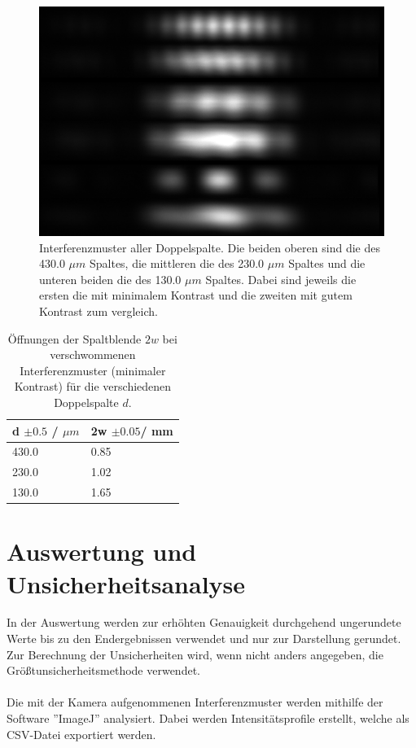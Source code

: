 \documentclass[12pt,a4paper,twoside]{article}
\begin{document}
\begin{figure}[H]
    \centering
    \includegraphics[width=0.6\linewidth]{nudes/aufgabe 4.jpg}
    \caption{Interferenzmuster aller Doppelspalte. Die beiden oberen sind die des 430.0 $\mu m$ Spaltes, die mittleren die des 230.0 $\mu m$ Spaltes und die unteren beiden die des 130.0 $\mu m$ Spaltes. 
    Dabei sind jeweils die ersten die mit minimalem Kontrast und die zweiten mit gutem Kontrast zum vergleich. }
    \label{fig:aufgabe 4}
\end{figure}

\begin{table}[H]
    \centering
    \caption{Öffnungen der  Spaltblende $2w$ bei verschwommenen Interferenzmuster (minimaler Kontrast) für die verschiedenen Doppelspalte $d$. }
    \label{tab:öffnungen}
    \begin{tabular}{| l | l |}
        \hline
        d $\pm 0.5$ / $\mu m $ & 2w $\pm 0.05$/ mm \\
        \hline
        430.0 & 0.85  \\
        230.0 & 1.02  \\
        130.0 & 1.65  \\
        \hline
    \end{tabular}
\end{table}

\section{Auswertung und Unsicherheitsanalyse} %

In der Auswertung werden zur erhöhten Genauigkeit durchgehend ungerundete Werte bis zu den Endergebnissen verwendet und nur zur Darstellung gerundet. \\
Zur Berechnung der Unsicherheiten wird, wenn nicht anders angegeben, die Größtunsicherheitsmethode verwendet.
\\
\\
Die mit der Kamera aufgenommenen Interferenzmuster werden mithilfe der Software ''ImageJ'' analysiert. 
Dabei werden Intensitätsprofile erstellt, welche als CSV-Datei exportiert werden. 
\end{document}
